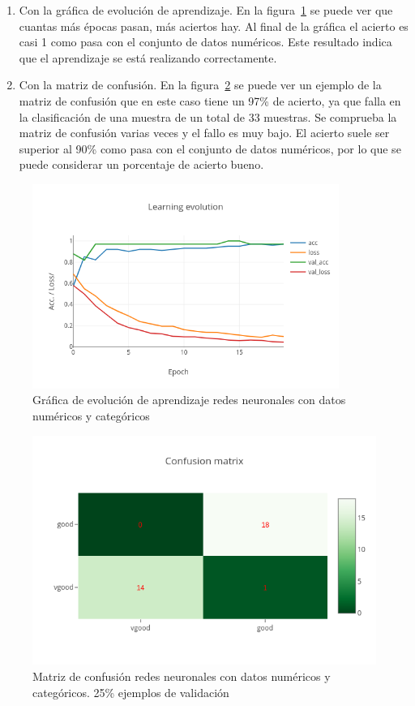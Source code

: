 \documentclass[a4paper, 12pt]{book}
\begin{document}
\begin{enumerate}
\item Con la gráfica de evolución de aprendizaje. En la figura~\ref{fig:ejemplo18} se puede ver que cuantas más épocas pasan, más aciertos hay. Al final de la gráfica el acierto es casi 1 como pasa con el conjunto de datos numéricos.
Este resultado indica que el aprendizaje se está realizando correctamente.
 \item Con la matriz de confusión. En la figura~\ref{fig:ejemplo19} se puede ver un ejemplo de la matriz de confusión que en este caso tiene un 97\% de acierto, ya que falla en la clasificación de una muestra de un total de 33 muestras. Se comprueba la matriz de confusión varias veces y el fallo es muy bajo. El acierto suele ser superior al 90\% como pasa con el conjunto de datos numéricos, por lo que se puede considerar un porcentaje de acierto bueno.
 \end{enumerate}
 
 \begin{figure}
	\centering
	\includegraphics[width=10cm, keepaspectratio]{img/le_numycat_rn.png}
	\caption{Gráfica de evolución de aprendizaje redes neuronales con datos numéricos y categóricos} 	\label{fig:ejemplo18}
\end{figure}

\begin{figure}
	\centering
	\includegraphics[width=12cm, keepaspectratio]{img/cm_numycat_rn.png}
	\caption{Matriz de confusión redes neuronales con datos numéricos y categóricos. 25\% ejemplos de validación} 	
	\label{fig:ejemplo19}
\end{figure}
\end{document}
